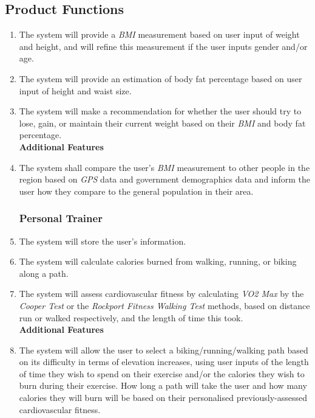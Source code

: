 \documentclass[12pt,letterpaper]{article}
\begin{document}
\subsection{Product Functions}
\begin{enumerate}[{F}1. ]
\subsubsection{Physician}
\item The system will provide a \textit{BMI} measurement based on user input of weight and height, and will refine this measurement if the user inputs gender and/or age.

\item The system will provide an estimation of body fat percentage based on user input of height and waist size.

\item The system will make a recommendation for whether the user should try to lose, gain, or maintain their current weight based on their \textit{BMI} and body fat percentage.\\

\textbf{Additional Features}
\item The system shall compare the user's \textit{BMI} measurement to other people in the region based on \textit{GPS} data and government demographics data and inform the user how they compare to the general population in their area.
\subsubsection{Personal Trainer}
\item The system will store the user's information.

\item The system will calculate calories burned from walking, running, or biking along a path.

\item The system will assess cardiovascular fitness by calculating \textit{VO2 Max} by the \textit{Cooper Test} or the \textit{Rockport Fitness Walking Test} methods, based on distance run or walked respectively, and the length of time this took.\\

\textbf{Additional Features}
\item The system will allow the user to select a biking/running/walking path based on its difficulty in terms of elevation increases, using user inputs of the length of time they wish to spend on their exercise and/or the calories they wish to burn during their exercise. How long a path will take the user and how many calories they will burn will be based on their personalised previously-assessed cardiovascular fitness.


\end{enumerate}
\end{document}
